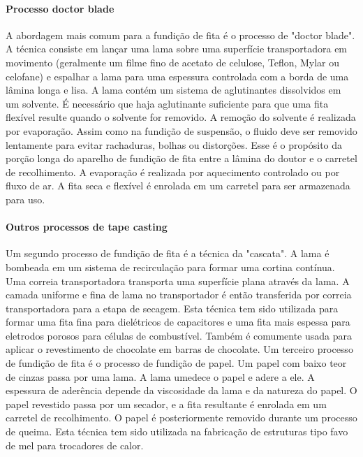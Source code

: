\paragraph*{Processo doctor blade}

A abordagem mais comum para a fundição de fita é o processo de "doctor blade". A técnica consiste em lançar uma lama sobre uma superfície transportadora em movimento (geralmente um filme fino de acetato de celulose, Teflon, Mylar ou celofane) e espalhar a lama para uma espessura controlada com a borda de uma lâmina longa e lisa. A lama contém um sistema de aglutinantes dissolvidos em um solvente. É necessário que haja aglutinante suficiente para que uma fita flexível resulte quando o solvente for removido. A remoção do solvente é realizada por evaporação. Assim como na fundição de suspensão, o fluido deve ser removido lentamente para evitar rachaduras, bolhas ou distorções. Esse é o propósito da porção longa do aparelho de fundição de fita entre a lâmina do doutor e o carretel de recolhimento. A evaporação é realizada por aquecimento controlado ou por fluxo de ar. A fita seca e flexível é enrolada em um carretel para ser armazenada para uso.

\paragraph*{Outros processos de tape casting}

Um segundo processo de fundição de fita é a técnica da "cascata". A lama é bombeada em um sistema de recirculação para formar uma cortina contínua. Uma correia transportadora transporta uma superfície plana através da lama. A camada uniforme e fina de lama no transportador é então transferida por correia transportadora para a etapa de secagem. Esta técnica tem sido utilizada para formar uma fita fina para dielétricos de capacitores e uma fita mais espessa para eletrodos porosos para células de combustível. Também é comumente usada para aplicar o revestimento de chocolate em barras de chocolate. Um terceiro processo de fundição de fita é o processo de fundição de papel. Um papel com baixo teor de cinzas passa por uma lama. A lama umedece o papel e adere a ele. A espessura de aderência depende da viscosidade da lama e da natureza do papel. O papel revestido passa por um secador, e a fita resultante é enrolada em um carretel de recolhimento. O papel é posteriormente removido durante um processo de queima. Esta técnica tem sido utilizada na fabricação de estruturas tipo favo de mel para trocadores de calor.

